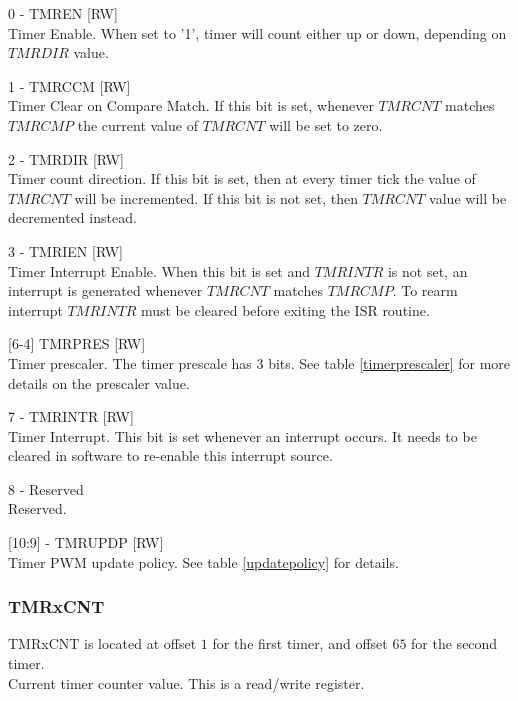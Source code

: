 \begin{description}

\item{0 - TMREN [RW]} \hfill \\
Timer Enable. When set to '1', timer will count either up or down, depending on $TMRDIR$ value.

\item{1 - TMRCCM [RW]} \hfill \\
Timer Clear on Compare Match. If this bit is set, whenever $TMRCNT$ matches $TMRCMP$ the current
value of $TMRCNT$ will be set to zero.

\item{2 - TMRDIR [RW]}\hfill \\
Timer count direction. If this bit is set, then at every timer tick the value of $TMRCNT$ will be incremented. If this
bit is not set, then $TMRCNT$ value will be decremented instead.

\item{3 - TMRIEN [RW]} \hfill \\
Timer Interrupt Enable. When this bit is set and $TMRINTR$ is not set, an interrupt is generated whenever 
$TMRCNT$ matches $TMRCMP$.
To rearm interrupt $TMRINTR$ must be cleared before exiting the ISR routine.

\item{[6-4] TMRPRES [RW]} \hfill \\
Timer prescaler. The timer prescale has 3 bits. See table \ref{timerprescaler} for more details on the prescaler value.
                 
\item{7 - TMRINTR [RW]} \hfill \\
Timer Interrupt. This bit is set whenever an interrupt occurs. It needs to be cleared in software to re-enable this interrupt
source.

\item{8 - Reserved} \hfill \\
Reserved.

\item{[10:9] - TMRUPDP [RW]} \hfill \\
Timer PWM update policy. See table \ref{updatepolicy} for details.

\end{description}


\subsubsection{TMRxCNT}
TMRxCNT is located at offset $1$ for the first timer, and offset $65$ for the second timer. \\
Current timer counter value. This is a read/write register.

